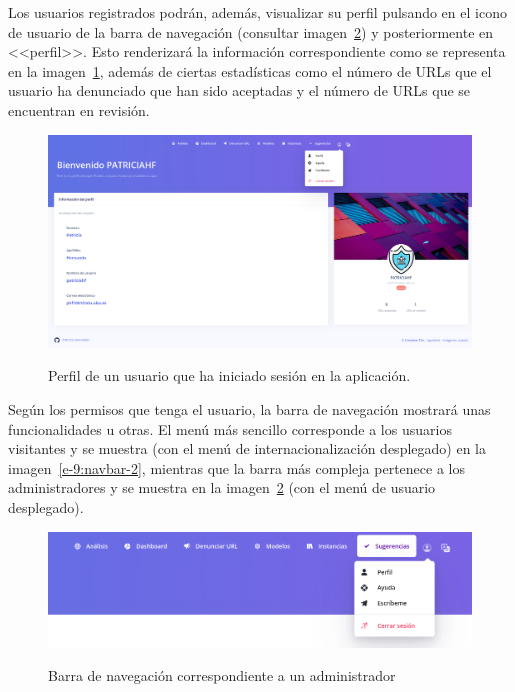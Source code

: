 Los usuarios registrados podrán, además, visualizar su perfil pulsando en el icono de usuario de la barra de navegación (consultar imagen~\ref{e-9:navbar}) y posteriormente en <<perfil>>. Esto renderizará la información correspondiente como se representa en la imagen~\ref{e-8:profile}, además de ciertas estadísticas como el número de URLs que el usuario ha denunciado que han sido aceptadas y el número de URLs que se encuentran en revisión.

\begin{figure}[h]
	\caption[Manual de usuario: perfil]{Perfil de un usuario que ha iniciado sesión en la aplicación.}
	\centering
	\includegraphics[width=\textwidth]{../img/anexos/user_guide/8_profile}
	\label{e-8:profile}
\end{figure}

Según los permisos que tenga el usuario, la barra de navegación mostrará unas funcionalidades u otras. El menú más sencillo corresponde a los usuarios visitantes y se muestra (con el menú de internacionalización desplegado) en la imagen~\ref{e-9:navbar-2}, mientras que la barra más compleja pertenece a los administradores y se muestra en la imagen~\ref{e-9:navbar} (con el menú de usuario desplegado).
\begin{figure}[h]
	\caption[Manual de usuario: barra navegación (usuario iniciado)]{Barra de navegación correspondiente a un administrador}
	\centering
	\includegraphics[width=\textwidth]{../img/anexos/user_guide/9_navbar_init}
	\label{e-9:navbar}
\end{figure}

